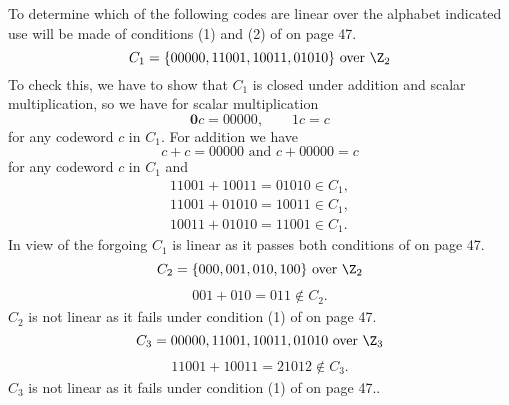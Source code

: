 To determine which of the following codes are linear over the alphabet
indicated use will be made of conditions (1) and (2) of \hill on page 47.
\qsubpart
\[
	C_1 = \{00000, 11001, 10011, 01010\} \textrm{\ over\ } \Z_2
\]
To check this, we have to show that $C_1$ is closed under addition and scalar multiplication, so we have for scalar multiplication
\[
	\textbf{0}c = 00000,\qquad 1c = c
\]
for any codeword $c$ in $C_1$. For addition we have
\[
	c + c = 00000 \textrm{\ and\ } c + 00000 = c
\]
for any codeword $c$ in $C_1$ and
\begin{align*}
	11001 + 10011 = 01010 \in C_1,\\
	11001 + 01010 = 10011 \in C_1,\\
	10011 + 01010 = 11001 \in C_1.
\end{align*}
In view of the forgoing $C_1$ is linear as it passes both conditions of \hill on page 47.
\qsubpart
\[
	C_2 = \{000, 001, 010, 100\} \textrm{\ over\ } \Z_2
\]
\begin{align*}
	 001 + 010 = 011 \not\in C_2.
\end{align*}
$C_2$ is not linear as it fails under condition (1) of \hill on page 47.
\qsubpart
\[
	C_3 = {00000, 11001, 10011, 01010} \textrm{\ over\ } \Z_3
\]
\begin{align*}
	11001 + 10011 = 21012 \not\in C_3.
\end{align*}
$C_3$ is not linear as it fails under condition (1) of \hill on page 47..